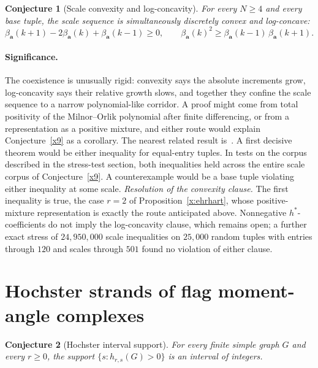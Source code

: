 \documentclass[11pt]{article}
\newtheorem{conjecture}{Conjecture}
\theoremstyle{definition}
\begin{document}
\begin{conjecture}[Scale convexity and log-concavity]\label{x10}
For every $N\ge4$ and every base tuple, the scale sequence is simultaneously discretely convex and log-concave:
\[
\beta_{\mathbf a}(k+1)-2\beta_{\mathbf a}(k)+\beta_{\mathbf a}(k-1)\ge0,
\qquad
\beta_{\mathbf a}(k)^2\ge\beta_{\mathbf a}(k-1)\,\beta_{\mathbf a}(k+1).
\]
\end{conjecture}

\paragraph{Significance.}
The coexistence is unusually rigid: convexity says the absolute increments grow, log-concavity says their relative growth slows, and together they confine the scale sequence to a narrow polynomial-like corridor.  A proof might come from total positivity of the Milnor--Orlik polynomial after finite differencing, or from a representation as a positive mixture, and either route would explain Conjecture~\ref{x9} as a corollary.  The nearest related result is~\cite{MO70}.  A first decisive theorem would be either inequality for equal-entry tuples.  In tests on the corpus described in the stress-test section, both inequalities held across the entire scale corpus of Conjecture~\ref{x9}.  A counterexample would be a base tuple violating either inequality at some scale.  \emph{Resolution of the convexity clause.} The first inequality is true, the case $r=2$ of Proposition~\ref{x:ehrhart}, whose positive-mixture representation is exactly the route anticipated above.  Nonnegative $h^{*}$-coefficients do not imply the log-concavity clause, which remains open; a further exact stress of $24{,}950{,}000$ scale inequalities on $25{,}000$ random tuples with entries through $120$ and scales through $501$ found no violation of either clause.

\section{Hochster strands of flag moment-angle complexes}

\begin{conjecture}[Hochster interval support]\label{x11}
For every finite simple graph $G$ and every $r\ge0$, the support $\{s:h_{r,s}(G)>0\}$ is an interval of integers.
\end{conjecture}
\end{document}
